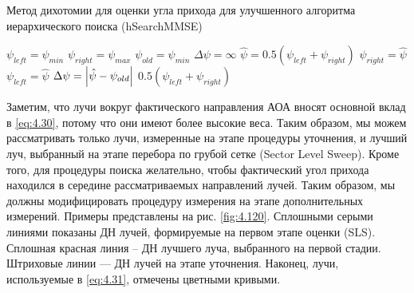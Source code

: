 \begin{algorithm}
    \caption{Метод дихотомии для оценки угла прихода для улучшенного алгоритма иерархического поиска (hSearchMMSE)}
    \label{lst:4.1}
    \begin{algorithmic}
        \State $\psi_{left} = \psi_{min}$
        \State $\psi_{right} = \psi_{max}$
        \State $\psi_{old} = \psi_{min}$
        \State $\Delta \psi = \infty$
        \While{$\Delta \psi > \epsilon$}
        \State $\hat \psi = 0.5 (\psi_{left} + \psi_{right})$
        \State $\psi_{right} = \hat\psi$
        \Else
        \State $\psi_{left} = \hat\psi$
        \EndIf
        \State $\Delta \psi = \abs{\hat \psi - \psi_{old}}$
        \EndWhile
        \State \Return $0.5(\psi_{left} + \psi_{right})$
    \end{algorithmic}
\end{algorithm}

Заметим, что лучи вокруг фактического направления АОА вносят основной вклад в
\eqref{eq:4.30}, потому что они имеют более высокие веса. Таким образом, мы
можем рассматривать только лучи, измеренные на этапе процедуры уточнения, и
лучший луч, выбранный на этапе перебора по грубой сетке (Sector Level Sweep). Кроме того, для
процедуры поиска желательно, чтобы фактический угол прихода находился в середине
рассматриваемых направлений лучей. Таким образом, мы должны модифицировать
процедуру измерения на этапе дополнительных измерений. Примеры
представлены на рис.  \ref{fig:4.120}.
Сплошными серыми линиями показаны ДН лучей, формируемые на первом этапе оценки
(SLS). Сплошная красная линия -- ДН лучшего луча,
выбранного на первой стадии. Штриховые линии — ДН лучей на этапе
уточнения. Наконец, лучи, используемые в \eqref{eq:4.31}, отмечены цветными кривыми.

